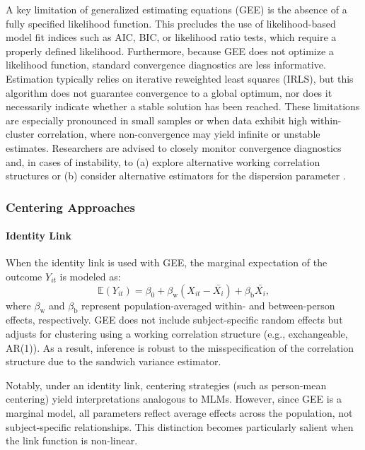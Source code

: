 \documentclass[stu]{apa7}
\begin{document}
A key limitation of generalized estimating equations (GEE) is the absence of a fully specified likelihood function. This precludes the use of likelihood-based model fit indices such as AIC, BIC, or likelihood ratio tests, which require a properly defined likelihood. Furthermore, because GEE does not optimize a likelihood function, standard convergence diagnostics are less informative. Estimation typically relies on iterative reweighted least squares (IRLS), but this algorithm does not guarantee convergence to a global optimum, nor does it necessarily indicate whether a stable solution has been reached. These limitations are especially pronounced in small samples or when data exhibit high within-cluster correlation, where non-convergence may yield infinite or unstable estimates. Researchers are advised to closely monitor convergence diagnostics and, in cases of instability, to (a) explore alternative working correlation structures or (b) consider alternative estimators for the dispersion parameter \parencite[p. 97]{hardin_generalized_2012}.

\subsubsection{Centering Approaches}

\paragraph{Identity Link}

When the identity link is used with GEE, the marginal expectation of the outcome \( Y_{it} \) is modeled as:
\begin{equation}
\mathbb{E}(Y_{it}) = \beta_0 + \beta_\text{w}(X_{it} - \bar{X_i}) + \beta_\text{b} \bar{X_i},
\end{equation}
where \( \beta_\text{w} \) and \( \beta_\text{b} \) represent population-averaged within- and between-person effects, respectively. GEE does not include subject-specific random effects but adjusts for clustering using a working correlation structure (e.g., exchangeable, AR(1)). As a result, inference is robust to the misspecification of the correlation structure due to the sandwich variance estimator.

Notably, under an identity link, centering strategies (such as person-mean centering) yield interpretations analogous to MLMs. However, since GEE is a marginal model, all parameters reflect average effects across the population, not subject-specific relationships. This distinction becomes particularly salient when the link function is non-linear.
\end{document}
